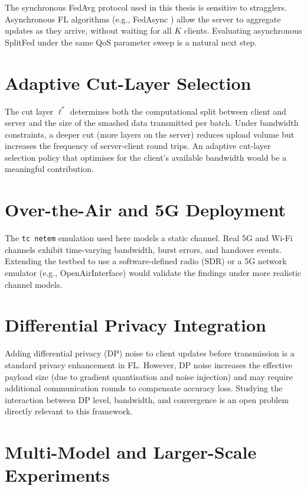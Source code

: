 \documentclass[12pt,a4paper]{report}
\begin{document}
The synchronous FedAvg protocol used in this thesis is sensitive to stragglers. Asynchronous FL algorithms (e.g., FedAsync \cite{xie2019asynchronous}) allow the server to aggregate updates as they arrive, without waiting for all $K$ clients. Evaluating asynchronous SplitFed under the same QoS parameter sweep is a natural next step.

\section{Adaptive Cut-Layer Selection}

The cut layer $\ell^*$ determines both the computational split between client and server and the size of the smashed data transmitted per batch. Under bandwidth constraints, a deeper cut (more layers on the server) reduces upload volume but increases the frequency of server-client round trips. An adaptive cut-layer selection policy that optimises for the client's available bandwidth would be a meaningful contribution.

\section{Over-the-Air and 5G Deployment}

The \texttt{tc netem} emulation used here models a static channel. Real 5G and Wi-Fi channels exhibit time-varying bandwidth, burst errors, and handover events. Extending the testbed to use a software-defined radio (SDR) or a 5G network emulator (e.g., OpenAirInterface) would validate the findings under more realistic channel models.

\section{Differential Privacy Integration}

Adding differential privacy (DP) noise to client updates before transmission is a standard privacy enhancement in FL. However, DP noise increases the effective payload size (due to gradient quantisation and noise injection) and may require additional communication rounds to compensate accuracy loss. Studying the interaction between DP level, bandwidth, and convergence is an open problem directly relevant to this framework.

\section{Multi-Model and Larger-Scale Experiments}
\end{document}
